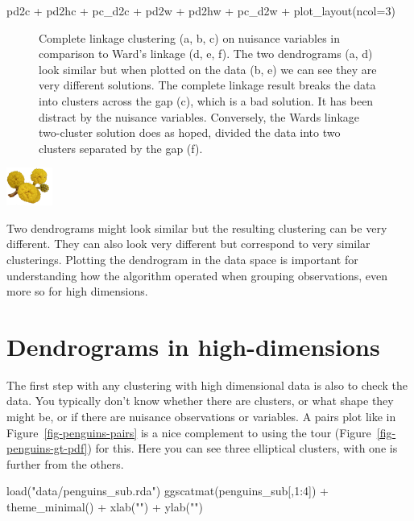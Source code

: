 \documentclass[
  letterpaper,
]{krantz}
\newenvironment{Shaded}{\begin{snugshade}}{\end{snugshade}}
\newcommand{\AttributeTok}[1]{\textcolor[rgb]{0.40,0.45,0.13}{#1}}
\newcommand{\DecValTok}[1]{\textcolor[rgb]{0.68,0.00,0.00}{#1}}
\newcommand{\FunctionTok}[1]{\textcolor[rgb]{0.28,0.35,0.67}{#1}}
\newcommand{\NormalTok}[1]{\textcolor[rgb]{0.00,0.23,0.31}{#1}}
\newcommand{\SpecialCharTok}[1]{\textcolor[rgb]{0.37,0.37,0.37}{#1}}
\newcommand{\StringTok}[1]{\textcolor[rgb]{0.13,0.47,0.30}{#1}}
\newcommand{\infobox}[1]{%
\noindent\colorbox{info!30}{%
\begin{minipage}{0.98\linewidth}%
    \centering%
    \begin{minipage}[c]{0.15\linewidth} %
      \includegraphics[width=1.5cm]{images/mulga-flowers2.png} %
    \end{minipage}%
    \hfill %
    \begin{minipage}[c]{0.8\linewidth} %
      \bigskip%
      \textsf{#1}%
      \bigskip%
    \end{minipage}%
    \hspace*{3mm}%
  \end{minipage}%
}%
}
\begin{document}
\begin{Shaded}
\begin{Highlighting}[]
\NormalTok{pd2c }\SpecialCharTok{+}\NormalTok{ pd2hc }\SpecialCharTok{+}\NormalTok{ pc\_d2c }\SpecialCharTok{+} 
\NormalTok{  pd2w }\SpecialCharTok{+}\NormalTok{ pd2hw }\SpecialCharTok{+}\NormalTok{ pc\_d2w }\SpecialCharTok{+}
  \FunctionTok{plot\_layout}\NormalTok{(}\AttributeTok{ncol=}\DecValTok{3}\NormalTok{)}
\end{Highlighting}
\end{Shaded}

\begin{figure}[H]


\caption{\label{fig-d2-c}Complete linkage clustering (a, b, c) on
nuisance variables in comparison to Ward's linkage (d, e, f). The two
dendrograms (a, d) look similar but when plotted on the data (b, e) we
can see they are very different solutions. The complete linkage result
breaks the data into clusters across the gap (c), which is a bad
solution. It has been distract by the nuisance variables. Conversely,
the Wards linkage two-cluster solution does as hoped, divided the data
into two clusters separated by the gap (f).}

\end{figure}%

\infobox{Two dendrograms might look similar but the resulting clustering can be very different. They can also look very different but correspond to very similar clusterings. Plotting the dendrogram in the data space is important for understanding how the algorithm operated when grouping observations, even more so for high dimensions.}

\section{Dendrograms in
high-dimensions}\label{dendrograms-in-high-dimensions}

The first step with any clustering with high dimensional data is also to
check the data. You typically don't know whether there are clusters, or
what shape they might be, or if there are nuisance observations or
variables. A pairs plot like in Figure~\ref{fig-penguins-pairs} is a
nice complement to using the tour (Figure~\ref{fig-penguins-gt-pdf}) for
this. Here you can see three elliptical clusters, with one is further
from the others.

\begin{Shaded}
\begin{Highlighting}[]
\FunctionTok{load}\NormalTok{(}\StringTok{"data/penguins\_sub.rda"}\NormalTok{)}
\FunctionTok{ggscatmat}\NormalTok{(penguins\_sub[,}\DecValTok{1}\SpecialCharTok{:}\DecValTok{4}\NormalTok{]) }\SpecialCharTok{+} 
  \FunctionTok{theme\_minimal}\NormalTok{() }\SpecialCharTok{+}
  \FunctionTok{xlab}\NormalTok{(}\StringTok{""}\NormalTok{) }\SpecialCharTok{+} \FunctionTok{ylab}\NormalTok{(}\StringTok{""}\NormalTok{)}
\end{Highlighting}
\end{Shaded}
\end{document}
